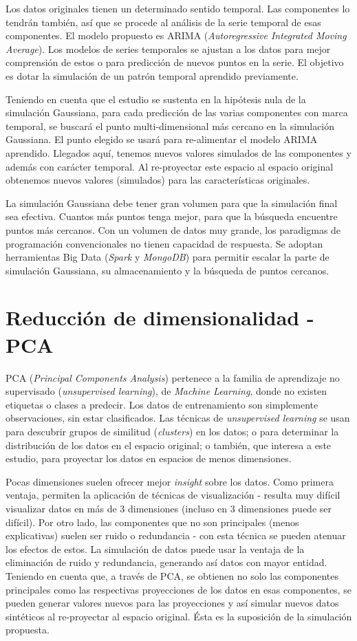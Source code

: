 \documentclass[11pt,spanish,listoffigures,listoftables]{tfgetsinf}
\begin{document}
Los datos originales tienen un determinado sentido temporal. Las componentes lo tendrán también, así que se procede al análisis de la serie temporal de esas componentes. El modelo propuesto es ARIMA ({\em Autoregressive Integrated Moving Average}). Los modelos de series temporales se ajustan a los datos para mejor comprensión de estos o para predicción de nuevos puntos en la serie. El objetivo es dotar la simulación de un patrón temporal aprendido previamente.

Teniendo en cuenta que el estudio se sustenta en la hipótesis nula de la simulación Gaussiana, para cada predicción de las varias componentes con marca temporal, se buscará el punto multi-dimensional más cercano en la simulación Gaussiana. El punto elegido se usará para re-alimentar el modelo ARIMA aprendido. Llegados aquí, tenemos nuevos valores simulados de las componentes y además con carácter temporal. Al re-proyectar este espacio al espacio original obtenemos nuevos valores (simulados) para las características originales.

La simulación Gaussiana debe tener gran volumen para que la simulación final sea efectiva. Cuantos más puntos tenga mejor, para que la búsqueda encuentre puntos más cercanos. Con un volumen de datos muy grande, los paradigmas de programación convencionales no tienen capacidad de respuesta. Se adoptan herramientas Big Data ({\em Spark} y {\em MongoDB}) para permitir escalar la parte de simulación Gaussiana, su almacenamiento y la búsqueda de puntos cercanos.


    \section{Reducción de dimensionalidad - PCA}
    PCA ({\em Principal Components Analysis}) pertenece a la familia de aprendizaje no supervisado ({\em unsupervised learning}), de {\em Machine Learning}, donde no existen etiquetas o clases a predecir. Los datos de entrenamiento son simplemente observaciones, sin estar clasificados. Las técnicas de {\em unsupervised learning} se usan para descubrir grupos de similitud ({\em clusters}) en los datos; o para determinar la distribución de los datos en el espacio original; o también, que interesa a este estudio, para proyectar los datos en espacios de menos dimensiones.

    Pocas dimensiones suelen ofrecer mejor {\em insight} sobre los datos. Como primera ventaja, permiten la aplicación de técnicas de visualización - resulta muy difícil visualizar datos en más de 3 dimensiones (incluso en 3 dimensiones puede ser difícil). Por otro lado, las componentes que no son principales (menos explicativas) suelen ser ruido o redundancia - con esta técnica se pueden atenuar los efectos de estos. La simulación de datos puede usar la ventaja de la eliminación de ruido y redundancia, generando así datos con mayor entidad. Teniendo en cuenta que, a través de PCA, se obtienen no solo las componentes principales como las respectivas proyecciones de los datos en esas componentes, se pueden generar valores nuevos para las proyecciones y así simular nuevos datos sintéticos al re-proyectar al espacio original. Ésta es la suposición de la simulación propuesta.
        
\end{document}

